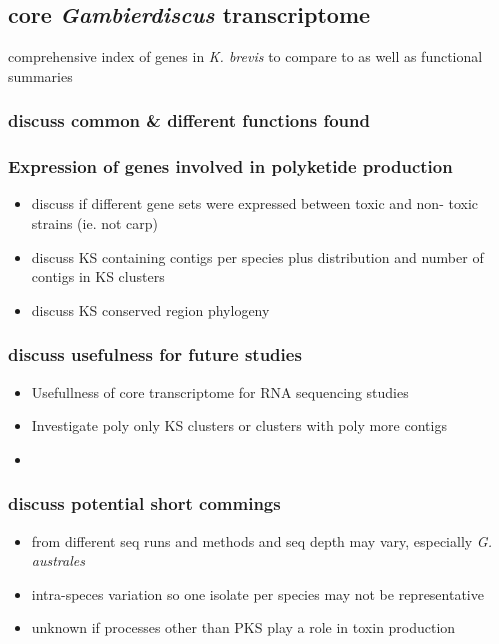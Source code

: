 \documentclass[12pt]{article}
\begin{document}
\subsection*{core \textit{Gambierdiscus} transcriptome}
 \cite{lidie2005gene} comprehensive index of genes in \textit{K. brevis} to compare to as well as functional summaries 

\subsubsection*{discuss common \& different functions found}


\subsubsection*{Expression of genes involved in polyketide production}
\begin{itemize}
\item discuss if different gene sets were expressed between toxic and non- toxic strains (ie. not carp)
\item discuss KS containing contigs per species plus distribution and number of contigs in KS clusters
\item discuss KS conserved region phylogeny
\end{itemize}


\subsubsection*{discuss usefulness for future studies}
\begin{itemize}
\item Usefullness of core transcriptome for RNA sequencing studies
\item Investigate poly only KS clusters or clusters with poly more contigs
\item 
\end{itemize}

\subsubsection*{discuss potential short commings} 
\begin{itemize}
\item from different seq runs and methods and seq depth may vary, especially \textit{G. australes}
\item intra-speces variation so one isolate per species may not be representative
\item unknown if processes other than PKS play a role in toxin production
\end{itemize}
\end{document}
